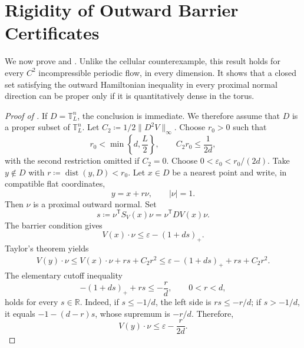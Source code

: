 \documentclass[11pt,reqno,noamsfonts]{amsart}
\theoremstyle{definition}
\theoremstyle{remark}
\newcommand{\R}{\mathbb R}
\newcommand{\T}{\mathbb T}
\newcommand{\dist}{\operatorname{dist}}
\newcommand{\e}{\varepsilon}
\begin{document}
\section{Rigidity of Outward Barrier Certificates}
\label{sec:no barrier}

We now prove  and
.  Unlike the cellular counterexample, this
result holds for every $C^2$ incompressible periodic flow, in every
dimension.  It shows that a closed set satisfying the outward
Hamiltonian inequality in every proximal normal direction can be proper
only if it is quantitatively dense in the torus.

\begin{proof}[Proof of ]
If $D=\T_L^n$, the conclusion is immediate. We therefore assume that
$D$ is a proper subset of $\T_L^n$. Let
  $C_2\coloneqq 1/2\|D^2V\|_\infty$.
Choose $r_0>0$ such that
\[
  r_0<\min\left\{d,\frac L2\right\},
  \qquad
  C_2r_0\le\frac1{2d},
\]
with the second restriction omitted if $C_2=0$.  Choose $0<\e_0<r_0/(2d)$.
Take $y\notin D$ with
  $r\coloneqq \dist(y,D)<r_0$.
Let $x\in D$ be a nearest point and write, in compatible flat
coordinates,
\[
  y=x+r\nu,
  \qquad |\nu|=1.
\]
Then $\nu$ is a proximal outward normal. Set
\[
  s\coloneqq
  \nu^{\mathsf T}S_V(x)\nu
  =
  \nu^{\mathsf T}DV(x)\nu.
\]
The barrier condition gives
\[
  V(x)\cdot \nu
  \le\e-(1+ds)_+.
\]
Taylor's theorem yields
\begin{align*}
  V(y)\cdot \nu
  \le V(x)\cdot \nu+rs+C_2r^2\le\e-(1+ds)_++rs+C_2r^2.
\end{align*}
The elementary cutoff inequality
\begin{equation*}
  -(1+ds)_++rs\le-\frac rd,
  \qquad 0<r<d,
\end{equation*}
holds for every $s\in\R$.  Indeed, if $s\le-1/d$, the left side is $rs\le-r/d$; if $s>-1/d$, it equals $-1-(d-r)s$, whose supremum is $-r/d$.  Therefore,
\begin{equation}\label{eq:drift-app}
  V(y)\cdot \nu
  \le\e-\frac r{2d}.
\end{equation}


\end{proof}
\end{document}
